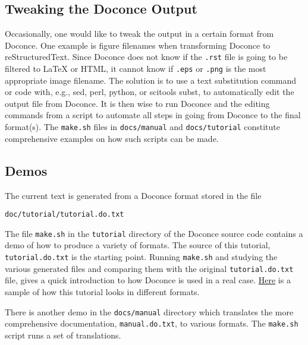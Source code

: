 \documentclass[%
oneside,                 %
final,                   %
10pt]{article}
\begin{document}
\subsection{Tweaking the Doconce Output}

Occasionally, one would like to tweak the output in a certain format
from Doconce. One example is figure filenames when transforming
Doconce to reStructuredText. Since Doconce does not know if the
{\fontsize{10pt}{10pt}\Verb!.rst!} file is going to be filtered to {\LaTeX} or HTML, it cannot know
if {\fontsize{10pt}{10pt}\Verb!.eps!} or {\fontsize{10pt}{10pt}\Verb!.png!} is the most appropriate image filename.
The solution is to use a text substitution command or code with, e.g., sed,
perl, python, or scitools subst, to automatically edit the output file
from Doconce. It is then wise to run Doconce and the editing commands
from a script to automate all steps in going from Doconce to the final
format(s). The {\fontsize{10pt}{10pt}\Verb!make.sh!} files in {\fontsize{10pt}{10pt}\Verb!docs/manual!} and {\fontsize{10pt}{10pt}\Verb!docs/tutorial!}
constitute comprehensive examples on how such scripts can be made.


\subsection{Demos}

The current text is generated from a Doconce format stored in the file
\begin{Verbatim}[fontsize=\fontsize{9pt}{9pt},tabsize=8,baselinestretch=0.85,fontfamily=tt,xleftmargin=7mm]
doc/tutorial/tutorial.do.txt
\end{Verbatim}
\noindent
The file {\fontsize{10pt}{10pt}\Verb!make.sh!} in the {\fontsize{10pt}{10pt}\Verb!tutorial!} directory of the
Doconce source code contains a demo of how to produce a variety of
formats.  The source of this tutorial, {\fontsize{10pt}{10pt}\Verb!tutorial.do.txt!} is the
starting point.  Running {\fontsize{10pt}{10pt}\Verb!make.sh!} and studying the various generated
files and comparing them with the original {\fontsize{10pt}{10pt}\Verb!tutorial.do.txt!} file,
gives a quick introduction to how Doconce is used in a real case.
\href{{https://doconce.googlecode.com/hg/doc/demos/tutorial/index.html}}{Here}
is a sample of how this tutorial looks in different formats.

There is another demo in the {\fontsize{10pt}{10pt}\Verb!docs/manual!} directory which
translates the more comprehensive documentation, {\fontsize{10pt}{10pt}\Verb!manual.do.txt!}, to
various formats. The {\fontsize{10pt}{10pt}\Verb!make.sh!} script runs a set of translations.
\end{document}

